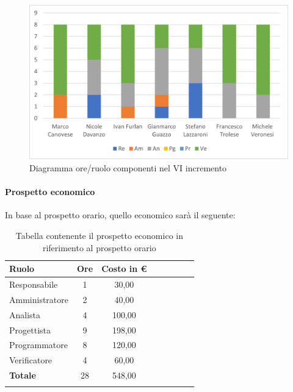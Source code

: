 \begin{figure}[H]
	\centering
	\includegraphics[width=0.8\linewidth]{res/images/preventivo/dettaglio_analisi/3-1.png}
	\caption{Diagramma ore/ruolo componenti nel VI incremento}
	\label{fig:diagramma suddivisione ruoli VI incremento}
\end{figure}

\paragraph{Prospetto economico}
In base al prospetto orario, quello economico sarà il seguente:

\begin{longtable}{|l|c|c|c|c|c|c|c|}
	\hline
	\rowcolor{lighter-grayer}
	\textbf{Ruolo}  & \textbf{Ore} & \textbf{Costo in €} \\
	\hline
	\endfirsthead

	\hline
	Responsabile    & 1            & 30,00              \\
	\hline
	\hline
	Amministratore  & 2            & 40,00               \\
	\hline
	\hline
	Analista        & 4           & 100,00              \\
	\hline
	\hline
	Progettista     & 9            & 198,00                   \\
	\hline
	\hline
	Programmatore   & 8            & 120,00                   \\
	\hline
	\hline
	Verificatore    & 4           & 60,00              \\
	\hline
	\textbf{Totale} & 28           & 548,00            \\
	\hline
	\rowcolor{white}
	\caption{Tabella contenente il prospetto economico in riferimento al prospetto orario}
\end{longtable}
\pagebreak


